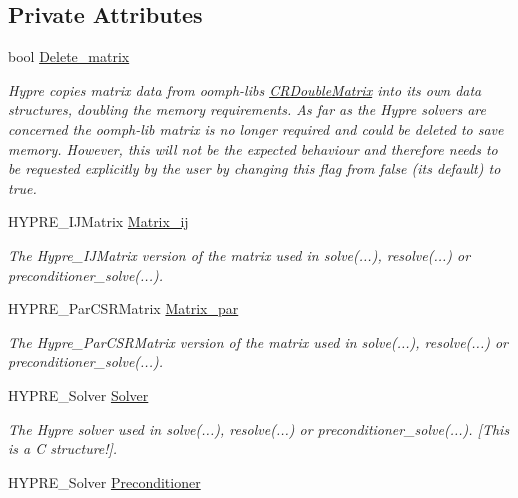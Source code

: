 \subsection*{Private Attributes}
\begin{DoxyCompactItemize}
\item 
bool \hyperlink{classoomph_1_1HypreInterface_a8668ea7323b2efb227a461e80d62b044}{Delete\+\_\+matrix}
\begin{DoxyCompactList}\small\item\em Hypre copies matrix data from oomph-\/lib\textquotesingle{}s \hyperlink{classoomph_1_1CRDoubleMatrix}{C\+R\+Double\+Matrix} into its own data structures, doubling the memory requirements. As far as the Hypre solvers are concerned the oomph-\/lib matrix is no longer required and could be deleted to save memory. However, this will not be the expected behaviour and therefore needs to be requested explicitly by the user by changing this flag from false (its default) to true. \end{DoxyCompactList}\item 
H\+Y\+P\+R\+E\+\_\+\+I\+J\+Matrix \hyperlink{classoomph_1_1HypreInterface_ad94c5a5a5191a786ce63e4d2c0d4c65d}{Matrix\+\_\+ij}
\begin{DoxyCompactList}\small\item\em The Hypre\+\_\+\+I\+J\+Matrix version of the matrix used in solve(...), resolve(...) or preconditioner\+\_\+solve(...). \end{DoxyCompactList}\item 
H\+Y\+P\+R\+E\+\_\+\+Par\+C\+S\+R\+Matrix \hyperlink{classoomph_1_1HypreInterface_a4a6418573f59098d6cfdaf9b36a6949d}{Matrix\+\_\+par}
\begin{DoxyCompactList}\small\item\em The Hypre\+\_\+\+Par\+C\+S\+R\+Matrix version of the matrix used in solve(...), resolve(...) or preconditioner\+\_\+solve(...). \end{DoxyCompactList}\item 
H\+Y\+P\+R\+E\+\_\+\+Solver \hyperlink{classoomph_1_1HypreInterface_a3b245194966a26307c86f3cf42062489}{Solver}
\begin{DoxyCompactList}\small\item\em The Hypre solver used in solve(...), resolve(...) or preconditioner\+\_\+solve(...). \mbox{[}This is a C structure!\mbox{]}. \end{DoxyCompactList}\item 
H\+Y\+P\+R\+E\+\_\+\+Solver \hyperlink{classoomph_1_1HypreInterface_a72e975bac0718a91226b20e9a819b30d}{Preconditioner}

\end{DoxyCompactItemize}
